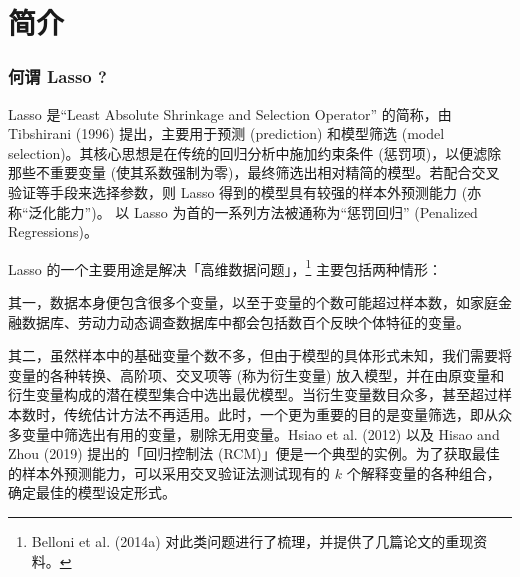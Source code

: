 



\section{简介}\label{sec:lassointro}

\subsubsection{何谓 Lasso ?}
Lasso 是“Least Absolute Shrinkage and Selection Operator” 的简称，由 Tibshirani (1996) 提出，主要用于预测 (prediction) 和模型筛选 (model selection)。其核心思想是在传统的回归分析中施加约束条件 (惩罚项)，以便滤除那些不重要变量 (使其系数强制为零)，最终筛选出相对精简的模型。若配合交叉验证等手段来选择参数，则 Lasso 得到的模型具有较强的样本外预测能力 (亦称“泛化能力”)。
以 Lasso 为首的一系列方法被通称为“惩罚回归” (Penalized Regressions)。

Lasso 的一个主要用途是解决「高维数据问题」，\footnote{%
   Belloni et al. (2014a) 对此类问题进行了梳理，并提供了几篇论文的重现资料。}
主要包括两种情形：

其一，数据本身便包含很多个变量，以至于变量的个数可能超过样本数，如家庭金融数据库、劳动力动态调查数据库中都会包括数百个反映个体特征的变量。

其二，虽然样本中的基础变量个数不多，但由于模型的具体形式未知，我们需要将变量的各种转换、高阶项、交叉项等 (称为衍生变量) 放入模型，并在由原变量和衍生变量构成的潜在模型集合中选出最优模型。当衍生变量数目众多，甚至超过样本数时，传统估计方法不再适用。此时，一个更为重要的目的是变量筛选，即从众多变量中筛选出有用的变量，剔除无用变量。Hsiao et al. (2012) 以及 Hisao and Zhou (2019) 提出的「回归控制法 (RCM)」便是一个典型的实例。为了获取最佳的样本外预测能力，可以采用交叉验证法测试现有的 $k$ 个解释变量的各种组合，确定最佳的模型设定形式。 

